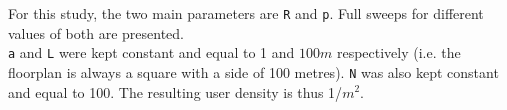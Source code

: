 \hfill \break
For this study, the two main parameters are
\colorbox{gray!30}{\large \texttt{R}} and \colorbox{gray!30}{\large \texttt{p}}.
Full sweeps for different values of both are presented.\\
\colorbox{gray!30}{\large \texttt{a}} and \colorbox{gray!30}{\large \texttt{L}}
were kept constant and equal to 1 and $100 m$ respectively (i.e. the floorplan
is always a square with a side of 100 metres).
\colorbox{gray!30}{\large \texttt{N}} was also kept constant and equal to 100.
The resulting user density is thus 1/$m^{2}$.
